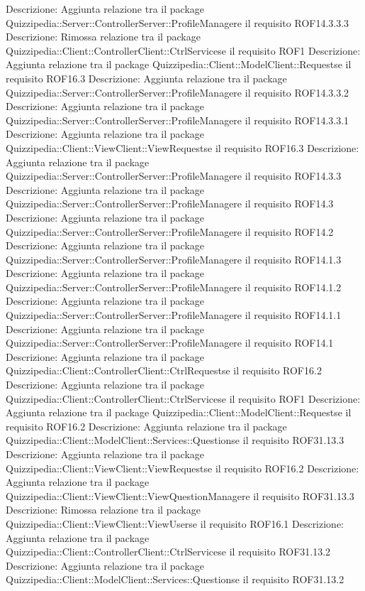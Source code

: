 Descrizione: Aggiunta relazione tra il package Quizzipedia::Server::ControllerServer::ProfileManagere il requisito ROF14.3.3.3 
Descrizione: Rimossa relazione tra il package Quizzipedia::Client::ControllerClient::CtrlServicese il requisito ROF1 
Descrizione: Aggiunta relazione tra il package Quizzipedia::Client::ModelClient::Requestse il requisito ROF16.3 
Descrizione: Aggiunta relazione tra il package Quizzipedia::Server::ControllerServer::ProfileManagere il requisito ROF14.3.3.2 
Descrizione: Aggiunta relazione tra il package Quizzipedia::Server::ControllerServer::ProfileManagere il requisito ROF14.3.3.1 
Descrizione: Aggiunta relazione tra il package Quizzipedia::Client::ViewClient::ViewRequestse il requisito ROF16.3 
Descrizione: Aggiunta relazione tra il package Quizzipedia::Server::ControllerServer::ProfileManagere il requisito ROF14.3.3 
Descrizione: Aggiunta relazione tra il package Quizzipedia::Server::ControllerServer::ProfileManagere il requisito ROF14.3 
Descrizione: Aggiunta relazione tra il package Quizzipedia::Server::ControllerServer::ProfileManagere il requisito ROF14.2 
Descrizione: Aggiunta relazione tra il package Quizzipedia::Server::ControllerServer::ProfileManagere il requisito ROF14.1.3 
Descrizione: Aggiunta relazione tra il package Quizzipedia::Server::ControllerServer::ProfileManagere il requisito ROF14.1.2 
Descrizione: Aggiunta relazione tra il package Quizzipedia::Server::ControllerServer::ProfileManagere il requisito ROF14.1.1 
Descrizione: Aggiunta relazione tra il package Quizzipedia::Server::ControllerServer::ProfileManagere il requisito ROF14.1 
Descrizione: Aggiunta relazione tra il package Quizzipedia::Client::ControllerClient::CtrlRequestse il requisito ROF16.2 
Descrizione: Aggiunta relazione tra il package Quizzipedia::Client::ControllerClient::CtrlServicese il requisito ROF1 
Descrizione: Aggiunta relazione tra il package Quizzipedia::Client::ModelClient::Requestse il requisito ROF16.2 
Descrizione: Aggiunta relazione tra il package Quizzipedia::Client::ModelClient::Services::Questionse il requisito ROF31.13.3 
Descrizione: Aggiunta relazione tra il package Quizzipedia::Client::ViewClient::ViewRequestse il requisito ROF16.2 
Descrizione: Aggiunta relazione tra il package Quizzipedia::Client::ViewClient::ViewQuestionManagere il requisito ROF31.13.3 
Descrizione: Rimossa relazione tra il package Quizzipedia::Client::ViewClient::ViewUserse il requisito ROF16.1 
Descrizione: Aggiunta relazione tra il package Quizzipedia::Client::ControllerClient::CtrlServicese il requisito ROF31.13.2 
Descrizione: Aggiunta relazione tra il package Quizzipedia::Client::ModelClient::Services::Questionse il requisito ROF31.13.2 
